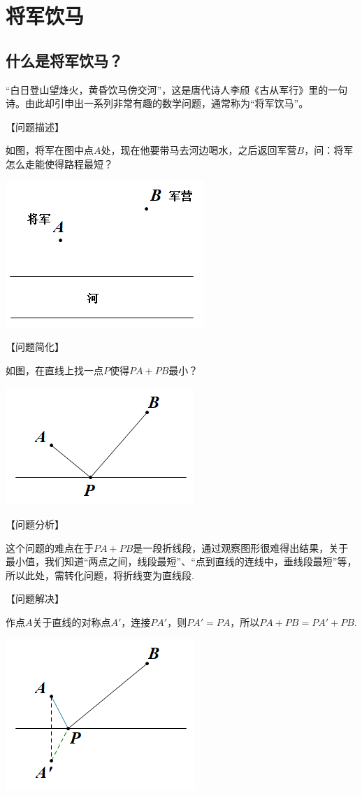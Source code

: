 \section{将军饮马}
\subsection{什么是将军饮马？}
“白日登山望烽火，黄昏饮马傍交河”，这是唐代诗人李颀《古从军行》里的一句诗。由此却引申出一系列非常有趣的数学问题，通常称为“将军饮马”。

【问题描述】

如图，将军在图中点$A$处，现在他要带马去河边喝水，之后返回军营$B$，问：将军怎么走能使得路程最短？
\begin{center}
\includegraphics[scale=0.6]{figure/1-1.PNG} 
\end{center}

【问题简化】

如图，在直线上找一点$P$使得$PA+PB$最小？

\includegraphics[scale=0.6]{figure/1-2.PNG} 

【问题分析】

这个问题的难点在于$PA+PB$是一段折线段，通过观察图形很难得出结果，关于最小值，我们知道“两点之间，线段最短”、“点到直线的连线中，垂线段最短”等，所以此处，需转化问题，将折线变为直线段.

【问题解决】

作点$A$关于直线的对称点$A'$，连接$PA'$，则$PA'=PA$，所以$PA+PB=PA'+PB$.

\includegraphics[scale=0.6]{figure/1-3.PNG} 

